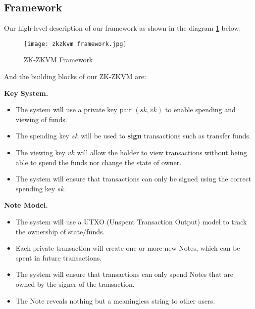 \subsection{Framework}\label{section: zk-zkvm-framework}

Our high-level description of our framework as shown in the diagram \ref{fig:zk-zkvm-framework} below:
\begin{figure}[!ht]
    \centering
    \texttt{[image: zkzkvm framework.jpg]}
    \caption{ZK-ZKVM Framework}
    \label{fig:zk-zkvm-framework}
\end{figure}

And the building blocks of our ZK-ZKVM are:

\textbf{Key System.}
\begin{itemize}
    \item The system will use a private key pair $(sk, vk)$ to enable spending and viewing of funds.
    \item The spending key $sk$ will be used to \textbf{sign} transactions such as transfer funds.
    \item The viewing key $vk$ will allow the holder to view transactions without being able to spend the funds nor change the state of owner.
    \item The system will ensure that transactions can only be signed using the correct spending key $sk$.
\end{itemize}
\bigskip

\textbf{Note Model.}
\begin{itemize}
    \item The system will use a UTXO (Unspent Transaction Output) model to track the ownership of state/funds.
    \item Each private transaction will create one or more new Notes, which can be spent in future transactions.
    \item The system will ensure that transactions can only spend Notes that are owned by the signer of the transaction.
    \item The Note reveals nothing but a meaningless string to other users.
\end{itemize}
\bigskip

